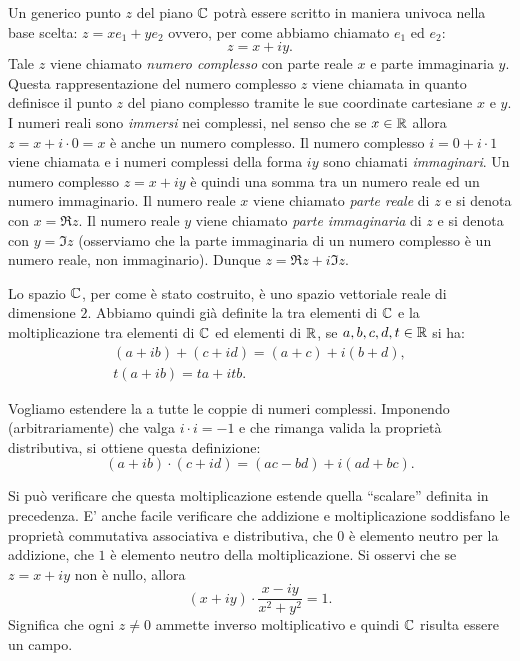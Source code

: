 Un generico punto $z$ del piano $\mathbb C$ potrà essere scritto in
maniera univoca nella base scelta: $z = x e_1 + y e_2$ ovvero,
per come abbiamo chiamato $e_1$ ed $e_2$:
\[
z = x + i y.
\]
Tale $z$ viene chiamato
\emph{numero complesso} con parte reale $x$ e parte immaginaria $y$.
Questa rappresentazione del numero complesso $z$ viene
chiamata  in quanto definisce
il punto $z$ del piano complesso tramite le sue coordinate cartesiane
$x$ e $y$.
I numeri reali sono \emph{immersi} nei complessi, nel senso che se
$x\in \mathbb R$ allora $z= x + i\cdot 0 = x$ è anche un numero complesso.
Il numero complesso $i = 0 + i\cdot 1$ viene chiamata 
e i numeri complessi della forma $iy$ sono chiamati \emph{immaginari}.
Un numero
complesso $z = x+iy$ è quindi una somma tra un numero reale ed un numero
immaginario. Il numero reale $x$ viene chiamato \emph{parte reale}
di $z$ e
si denota con $x=\Re z$.
Il numero reale $y$ viene chiamato
\emph{parte immaginaria}
di $z$ e si denota con $y=\Im z$
(osserviamo che la parte immaginaria di un numero complesso è un numero
reale, non immaginario). Dunque $z= \Re z + i \Im z$.

Lo spazio $\mathbb C$, per come
è stato costruito, è uno spazio vettoriale reale di dimensione $2$.
Abbiamo quindi già definite la 
tra elementi di $\mathbb C$ e la moltiplicazione
tra elementi di $\mathbb C$ ed elementi di $\mathbb R$,
se $a,b,c,d,t\in \mathbb R$ si ha:
\begin{gather*}
 (a+ib) + (c+id) = (a+c) + i (b+d), \\
 t(a+ib) = ta + itb.
\end{gather*}

Vogliamo estendere la  a tutte le coppie di numeri complessi.
Imponendo (arbitrariamente) che valga $i\cdot i = -1$ e che rimanga
valida la proprietà distributiva, si ottiene
questa definizione:
\[
   (a+ib) \cdot (c+id) = (ac-bd) + i(ad+bc).
\]

Si può verificare che questa moltiplicazione estende quella ``scalare'' definita
in precedenza.
E' anche facile verificare che addizione e moltiplicazione soddisfano
le proprietà commutativa associativa e distributiva,
che $0$ è elemento neutro per la addizione, che $1$ è elemento neutro
della moltiplicazione.
Si osservi che se $z=x+iy$ non è nullo, allora
\[
  (x+iy) \cdot \frac{x-iy}{x^2+y^2} = 1.
\]
Significa che ogni $z\neq 0$ ammette inverso moltiplicativo e quindi $\mathbb C$
risulta essere un campo.

